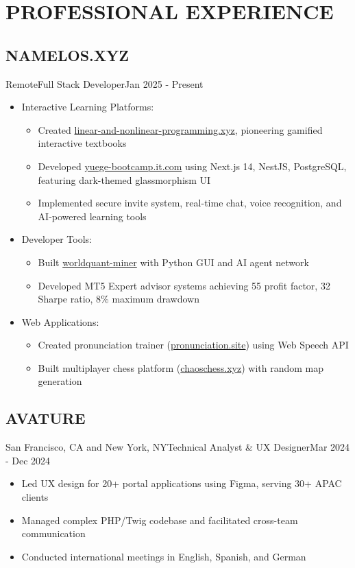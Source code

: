\section{PROFESSIONAL EXPERIENCE}

\subsection{NAMELOS.XYZ}{Remote}{Full Stack Developer}{Jan 2025 - Present}
\begin{itemize}
\item Interactive Learning Platforms:
    \begin{itemize}
    \item Created \href{https://www.linear-and-nonlinear-programming.xyz/}{\small linear-and-nonlinear-programming.xyz}, pioneering gamified interactive textbooks
    \item Developed \href{https://yuege-bootcamp.it.com/}{\small yuege-bootcamp.it.com} using Next.js 14, NestJS, PostgreSQL, featuring dark-themed glassmorphism UI
    \item Implemented secure invite system, real-time chat, voice recognition, and AI-powered learning tools
    \end{itemize}
\item Developer Tools:
    \begin{itemize}
    \item Built \href{https://github.com/zhutoutoutousan/worldquant-miner}{\small worldquant-miner} with Python GUI and AI agent network
    \item Developed MT5 Expert advisor systems achieving 55 profit factor, 32 Sharpe ratio, 8\% maximum drawdown
    \end{itemize}
\item Web Applications:
    \begin{itemize}
    \item Created pronunciation trainer (\href{https://www.pronunciation.site/}{\small pronunciation.site}) using Web Speech API
    \item Built multiplayer chess platform (\href{https://www.chaoschess.xyz/}{\small chaoschess.xyz}) with random map generation
    \end{itemize}
\end{itemize}

\subsection{AVATURE}{San Francisco, CA and New York, NY}{Technical Analyst \& UX Designer}{Mar 2024 - Dec 2024}
\begin{itemize}
\item Led UX design for 20+ portal applications using Figma, serving 30+ APAC clients
\item Managed complex PHP/Twig codebase and facilitated cross-team communication
\item Conducted international meetings in English, Spanish, and German
\end{itemize}

